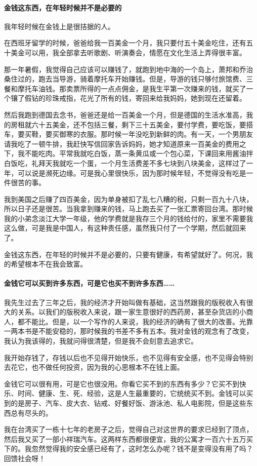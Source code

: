 \paragraph*{金钱这东西，在年轻时候并不是必要的}
\par 我年轻时候在金钱上是很拮据的人。
\par 在西班牙留学的时候，爸爸给我一百美金一个月，我只要付五十美金吃住，还有五十美金可以用，我全部拿去听歌剧、听演奏会，情愿在文化生活上弄得很丰富。
\par 那一年暑假，我觉得自己应该可以赚钱了，就跑到地中海的一个岛上，萧邦和乔治桑住过的，跑去当导游，骑着摩托车开始赚钱。但是，导游的钱只够付旅馆费、三餐和摩托车油钱。那卖票所得的一点点佣金，是我生平第一次赚来的钱，就买了一个镶了假钻的珍珠戒指，花光了所有的钱，寄回来给我妈妈，她到现在还留着。
\par 然后我跑到德国去念书，爸爸还是给一百美金一个月，但是德国的生活水准高，我的房租就六十五美金，还不包括三餐，剩下三十五美金，要付学费，要吃饭，要搭车，要买鞋，要买御寒的衣服。那时候一年没吃到新鲜的肉。有一天，一个男朋友请我吃了一顿牛排，我赶快写信回家告诉妈妈，她才知道原来一百美金的费用之下，我不能吃肉。平常我就吃白饭，蒸一条黄瓜或一个包心菜，下课回来用酱油拌白饭吃，礼拜天我就吃一个蛋，一个月生活费差不多七块到八块美金，这样过了一年，可以说是濒死边缘。可是我心里很快乐，因为那时候年轻，不觉得没有吃是一件很苦的事。
\par 我到美国之后赚了四百美金，因为单身被扣了乱七八糟的税，只剩一百九十八块，所以日子还是很苦。当我拿到赚来的钱，马上跑去买了一张汇票寄回台湾。那时候我的小弟念淡江大学一年级，他的学费就是我存三个月的钱给付的，家里不需要我这么做，可是我是中国人，有这种责任感，虽然我只付了一个学期，然后就回来了。
\par 金钱这东西，在年轻的时候并不是必要的，只要有健康，有希望就好了。何况，我的希望根本不在我会致富。
\paragraph*{金钱它可以买到许多东西，可是它也买不到许多东西……}
\par 我先生过去了三年之后，我的经济才开始叫做有基础，这当然跟我的版税收入有很大的关系。以我们的版税收入来说，跟一家生意很好的西药房，甚至杂货店的小商人，都不能比。但是，以一个写作的人来说，我的经济的确有了很大的改善。光靠一两本书是不能安稳的，那时候我的书差不多有五本。我对金钱的观念有了改变，我认为我该得的，我就问得很清楚，但是我不会刻意去追求它。
\par 我开始存钱了，存钱以后也不见得开始快乐，也不见得有安全感，也不见得会特别去花它，也不做任何投资，因为我的心思根本不在钱上面。
\par 金钱它可以很有用，可是它也很没用。你看它买不到的东西有多少？它买不到快乐、时间、健康、生、死、经验，这是人生最重要的，它统统买不到。金钱可以买到的是房子、汽车、皮大衣、钻戒、好餐好饭、游泳池、私人电影院，但是这些东西总有尽头的。
\par 我在台湾买了一栋十七年的老房子之后，觉得自己对这世界的要求已经到了顶点，然后我又买了一部小祥瑞汽车。这两样东西都很便宜，我的公寓才一百六十五万买下的。我忽然觉得我的安全感已经有了，这时怎么办呢？钱不是变得没有用了吗？回馈社会呀！
